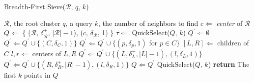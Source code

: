 \begin{minipage}{0.5125\textwidth}
    \begin{algorithm}[H]\small
        \caption{Breadth-First Sieve($\mathcal{R}$, $q$, $k$)} %
        \label{alg:methods:bredth-first-sieve} %
        \begin{algorithmic} %
            \Require $\mathcal{R}$, the root cluster
            \Require $q$, a query
            \Require $k$, the number of neighbors to find
            \State $c \Leftarrow$ \textit{center} of $\mathcal{R}$
            \State $Q \Leftarrow$ \{ ($\mathcal{R}$, $\delta^{+}_{\mathcal{R}}$, $|\mathcal{R}| - 1$), ($c$, $\delta_{\mathcal{R}}$, 1) \}
                \State $\tau \Leftarrow$ QuickSelect($Q$, $k$)
                \State $Q^{'} \Leftarrow \emptyset$
                            \State $Q^{'} \Leftarrow Q^{'} \cup \{ (C, \delta_{C}, 1) \}$
                            \State $Q^{'} \Leftarrow Q^{'} \cup \{ (p, \delta_{p}, 1)$ for $p \in C \}$
                        \Else
                            \State $[L, R] \Leftarrow$ children of $C$
                            \State $l, r \Leftarrow$ centers of $L, R$
                            \State $Q^{'} \Leftarrow Q^{'} \cup \{ (L, \delta^{+}_{L}, |L| - 1), (l, \delta_{L}, 1) \}$
                            \State $Q^{'} \Leftarrow Q^{'} \cup \{ (R, \delta^{+}_{R}, |R| - 1), (l, \delta_{R}, 1) \}$
                        \EndIf
                    \EndIf
                \EndFor
                \State $Q \Leftarrow Q^{'}$
            \EndWhile
            \State QuickSelect($Q$, $k$)
            \State \textbf{return} The first $k$ points in $Q$
        \end{algorithmic}
    \end{algorithm}
\end{minipage}
\hfill

